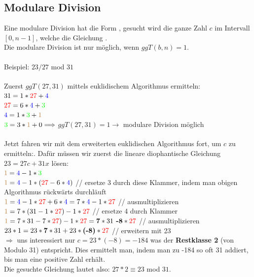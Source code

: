 \documentclass[landscape,twocolumn,a4paper]{article}
\begin{document}
\subsection{Modulare Division}
Eine modulare Division hat die Form  , gesucht wird die ganze Zahl $c$ im Intervall $[0,n-1]$, welche die Gleichung  .\\
Die modulare Division ist nur möglich, wenn $ggT(b,n)=1$.
\\\\
Beispiel: $23/27$ mod $31$
\\\\
Zuerst $ggT(27,31)$ mittels euklidischem Algorithmus ermitteln:\\
$31 = 1 * {\color{red}27} + {\color{blue}4}$\\
${\color{red}27} = 6 * {\color{blue}4} + {\color{green}3}$ \\
${\color{blue}4} = 1 * {\color{green}3} + {\color{brown}1}$\\
${\color{green}3} = 3 * {\color{brown}1} + 0 \Longrightarrow$ $ggT(27,31) = 1 \rightarrow$  modulare Division möglich \\
\\
Jetzt fahren wir mit dem erweiterten euklidischen Algorithmus fort, um $c$ zu ermitteln:. Dafür müssen wir zuerst die lineare diophantische Gleichung $23 = 27c + 31x$ lösen:\\

${\color{brown}1} = {\color{blue}4} - 1 * {\color{green}3}$\\
${\color{brown}1} = {\color{blue}4} - 1 * ({\color{red}27} - 6 * {\color{blue}4})$  {\color{gray}// ersetze $3$ durch diese Klammer, indem man obigen Algorithmus rückwärts durchläuft}\\
${\color{brown}1} = {\color{blue}4} - 1 * {\color{red}27} + 6 * {\color{blue}4} = 7 * {\color{blue}4} - 1 * {\color{red}27}$  {\color{gray}// ausmultiplizieren}\\
${\color{brown}1} = 7 * (31 - 1 * {\color{red}27}) - 1 * {\color{red}27}$  {\color{gray}// ersetze {\color{blue}4} durch Klammer}\\
${\color{brown}1} = 7 * 31 - 7 * {\color{red}27}) - 1 * {\color{red}27} = \textbf{7} * 31 \textbf{ -8} * {\color{red}27}$  {\color{gray}// ausmultiplizieren}\\
$23 * 1 = 23 * \textbf{7} * 31 + 23 * \textbf{(-8)} * {\color{red}27}$  {\color{gray}// erweitern mit 23}\\
$\Longrightarrow$ uns interessiert nur $c = 23 * (-8) = -184$ was der \textbf{Restklasse 2} (von Modulo 31) entspricht. Dies ermittelt man, indem man zu -184 so oft 31 addiert, bis man eine positive Zahl erhält.\\
Die gesuchte Gleichung lautet also: $27 * 2 \equiv 23$ mod $31$.
\end{document}
